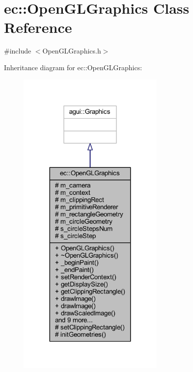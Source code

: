 \hypertarget{classec_1_1_open_g_l_graphics}{}\section{ec\+:\+:Open\+G\+L\+Graphics Class Reference}
\label{classec_1_1_open_g_l_graphics}


{\ttfamily \#include $<$Open\+G\+L\+Graphics.\+h$>$}



Inheritance diagram for ec\+:\+:Open\+G\+L\+Graphics\+:\nopagebreak
\begin{figure}[H]
\begin{center}
\leavevmode
\includegraphics[width=203pt]{classec_1_1_open_g_l_graphics__inherit__graph}
\end{center}
\end{figure}


